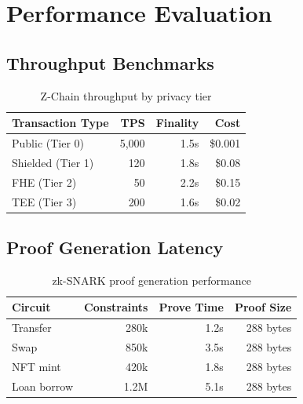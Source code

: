 \section{Performance Evaluation}


\subsection{Throughput Benchmarks}

\begin{table}[h]
\centering
\begin{tabular}{lrrr}
\toprule
Transaction Type & TPS & Finality & Cost \\
\midrule
Public (Tier 0) & 5,000 & 1.5s & \$0.001 \\
Shielded (Tier 1) & 120 & 1.8s & \$0.08 \\
FHE (Tier 2) & 50 & 2.2s & \$0.15 \\
TEE (Tier 3) & 200 & 1.6s & \$0.02 \\
\bottomrule
\end{tabular}
\caption{Z-Chain throughput by privacy tier}
\end{table}

\subsection{Proof Generation Latency}

\begin{table}[h]
\centering
\begin{tabular}{lrrr}
\toprule
Circuit & Constraints & Prove Time & Proof Size \\
\midrule
Transfer & 280k & 1.2s & 288 bytes \\
Swap & 850k & 3.5s & 288 bytes \\
NFT mint & 420k & 1.8s & 288 bytes \\
Loan borrow & 1.2M & 5.1s & 288 bytes \\
\bottomrule
\end{tabular}
\caption{zk-SNARK proof generation performance}
\end{table}

